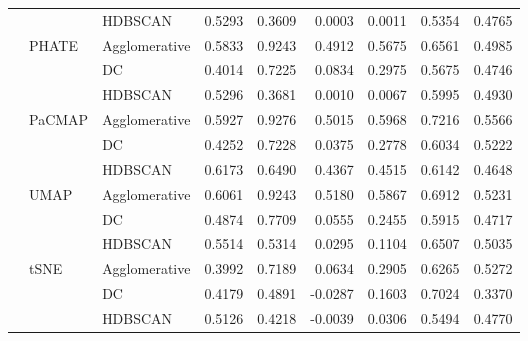 \begin{table}
\begin{tabular}{lllrrrrrr}
 &  & HDBSCAN & 0.5293 & 0.3609 & 0.0003 & 0.0011 & 0.5354 & 0.4765 \\
\cline{2-9}
 & \multirow[t]{3}{*}{PHATE} & Agglomerative & 0.5833 & 0.9243 & 0.4912 & 0.5675 & 0.6561 & 0.4985 \\
 &  & DC & 0.4014 & 0.7225 & 0.0834 & 0.2975 & 0.5675 & 0.4746 \\
 &  & HDBSCAN & 0.5296 & 0.3681 & 0.0010 & 0.0067 & 0.5995 & 0.4930 \\
\cline{2-9}
 & \multirow[t]{3}{*}{PaCMAP} & Agglomerative & 0.5927 & 0.9276 & 0.5015 & 0.5968 & 0.7216 & 0.5566 \\
 &  & DC & 0.4252 & 0.7228 & 0.0375 & 0.2778 & 0.6034 & 0.5222 \\
 &  & HDBSCAN & 0.6173 & 0.6490 & 0.4367 & 0.4515 & 0.6142 & 0.4648 \\
\cline{2-9}
 & \multirow[t]{3}{*}{UMAP} & Agglomerative & 0.6061 & 0.9243 & 0.5180 & 0.5867 & 0.6912 & 0.5231 \\
 &  & DC & 0.4874 & 0.7709 & 0.0555 & 0.2455 & 0.5915 & 0.4717 \\
 &  & HDBSCAN & 0.5514 & 0.5314 & 0.0295 & 0.1104 & 0.6507 & 0.5035 \\
\cline{2-9}
 & \multirow[t]{3}{*}{tSNE} & Agglomerative & 0.3992 & 0.7189 & 0.0634 & 0.2905 & 0.6265 & 0.5272 \\
 &  & DC & 0.4179 & 0.4891 & -0.0287 & 0.1603 & 0.7024 & 0.3370 \\
 &  & HDBSCAN & 0.5126 & 0.4218 & -0.0039 & 0.0306 & 0.5494 & 0.4770 \\
\cline{1-9} \cline{2-9}
\bottomrule
\end{tabular}
\end{table}
